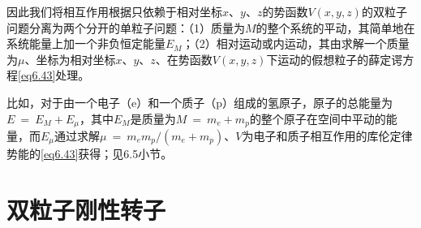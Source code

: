 \documentclass[12pt,a4paper,openany]{ctexbook}
\begin{document}
\begin{flushleft}
因此我们将相互作用根据只依赖于相对坐标$x$、$y$、$z$的势函数$V(x,y,z)$的双粒子问题分离为两个分开的单粒子问题：（1）质量为$M$的整个系统的平动，其简单地在系统能量上加一个非负恒定能量$E_M$；（2）相对运动或内运动，其由求解一个质量为$\mu$、坐标为相对坐标$x$、$y$、$z$、在势函数$V(x,y,z)$下运动的假想粒子的薛定谔方程\eqref{eq6.43}处理。

比如，对于由一个电子（e）和一个质子（p）组成的氢原子，原子的总能量为$E\ =\ E_M+E_{\mu}$，其中$E_M$是质量为$M\ =\ m_e+m_p$的整个原子在空间中平动的能量，而$E_{\mu}$通过求解$\mu\ =\ m_em_p/(m_e+m_p)$、$V$为电子和质子相互作用的库伦定律势能的\eqref{eq6.43}获得；见6.5小节。
\end{flushleft}
\section{双粒子刚性转子}
\end{document}
